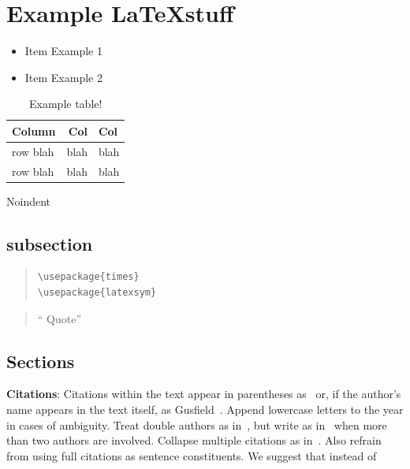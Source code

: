 \documentclass[11pt]{article}
\begin{document}
\section{Example \LaTeX stuff}
\begin{itemize}
\item Item Example 1
\item Item Example 2
\end{itemize}

\begin{table}[h]
\begin{center}
\begin{tabular}{|l|rl|}
\hline \bf Column & \bf Col & \bf Col \\ \hline
row blah & blah & blah \\
row blah & blah & blah \\
\hline
\end{tabular}
\end{center}
\caption{\label{font-table} Example table! }
\end{table}

\noindent Noindent


\subsection{subsection}

\begin{quote}
\begin{verbatim}
\usepackage{times}
\usepackage{latexsym}
\end{verbatim}
\end{quote}

\begin{quote}
  ``\cite{Graves:08} Quote''
\end{quote}

\subsection{Sections}

{\bf Citations}: Citations within the text appear in parentheses
as~\cite{Gusfield:97} or, if the author's name appears in the text
itself, as Gusfield~.  Append lowercase letters
to the year in cases of ambiguity.  Treat double authors as
in~\cite{Aho:72}, but write as in~\cite{Chandra:81} when more than two
authors are involved. Collapse multiple citations as
in~\cite{Gusfield:97,Aho:72}. Also refrain from using full citations
as sentence constituents. We suggest that instead of
\end{document}

